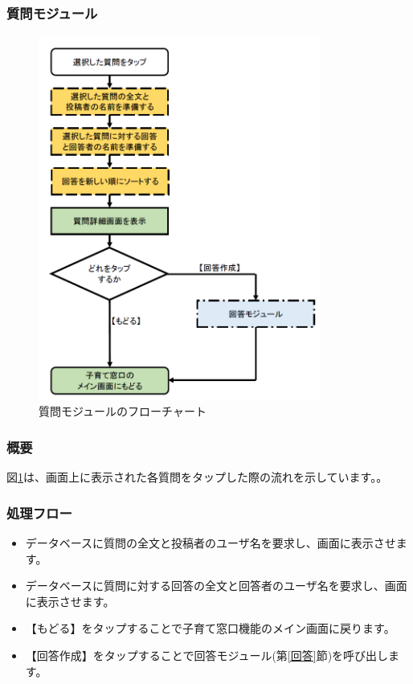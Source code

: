 \documentclass[a4j]{jarticle}
\begin{document}
\subsubsection{質問モジュール\label{質問}} %
\begin{figure}[H]
    \begin{center}
      \includegraphics[height = 12.0cm] {子育て窓口_質問.png} %
    \caption {質問モジュールのフローチャート}
    \label{子育て窓口_質問}
    \end{center}
\end{figure}
\subsubsection*{概要}
図\ref{子育て窓口_質問}は、画面上に表示された各質問をタップした際の流れを示しています。。
\subsubsection*{処理フロー}
\begin{itemize}
\item データベースに質問の全文と投稿者のユーザ名を要求し、画面に表示させます。
\item データベースに質問に対する回答の全文と回答者のユーザ名を要求し、画面に表示させます。
\item 【もどる】をタップすることで子育て窓口機能のメイン画面に戻ります。
\item 【回答作成】をタップすることで回答モジュール(第\ref{回答}節)を呼び出します。

\end{itemize}
\end{document}
